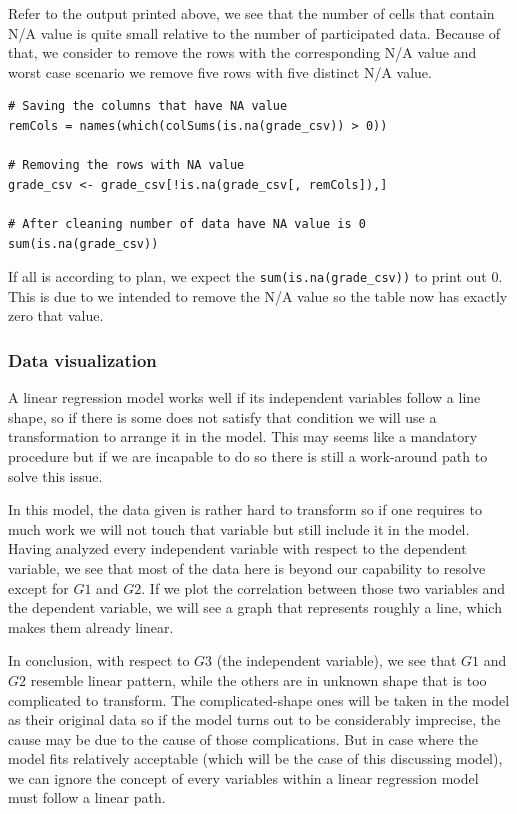 \documentclass[a4paper]{article}
\newcounter{subsubsubsection}[subsubsection]
\numberwithin{equation}{section}
\begin{document}
Refer to the output printed above, we see that the number of cells that contain N/A value is quite small relative to the number of participated data. Because of that, we consider to remove the rows with the corresponding N/A value and worst case scenario we remove five rows with five distinct N/A value.

\begin{mdframed}[leftline=false,rightline=false,backgroundcolor=magenta!10,nobreak=true]
  \begin{verbatim}
# Saving the columns that have NA value
remCols = names(which(colSums(is.na(grade_csv)) > 0))

# Removing the rows with NA value
grade_csv <- grade_csv[!is.na(grade_csv[, remCols]),]

# After cleaning number of data have NA value is 0
sum(is.na(grade_csv))
  \end{verbatim}
\end{mdframed}

If all is according to plan, we expect the \texttt{sum(is.na(grade_csv))} to print out 0. This is due to we intended to remove the N/A value so the table now has exactly zero that value.


\subsubsection{Data visualization}
A linear regression model works well if its independent variables follow a line shape, so if there is some does not satisfy that condition we will use a transformation to arrange it in the model. This may seems like a mandatory procedure but if we are incapable to do so there is still a work-around path to solve this issue.

In this model, the data given is rather hard to transform so if one requires to much work we will not touch that variable but still include it in the model. Having analyzed every independent variable with respect to the dependent variable, we see that most of the data here is beyond our capability to resolve except for \(G1\) and \(G2\). If we plot the correlation between those two variables and the dependent variable, we will see a graph that represents roughly a line, which makes them already linear.

In conclusion, with respect to \(G3\) (the independent variable), we see that \(G1\) and \(G2\) resemble linear pattern, while the others are in unknown shape that is too complicated to transform. The complicated-shape ones will be taken in the model as their original data so if the model turns out to be considerably imprecise, the cause may be due to the cause of those complications. But in case where the model fits relatively acceptable (which will be the case of this discussing model), we can ignore the concept of every variables within a linear regression model must follow a linear path.
\end{document}
